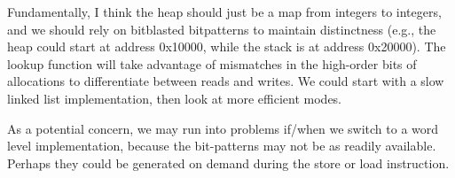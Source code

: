 \documentclass{article}
\begin{document}
Fundamentally, I think the heap should just be a map from integers to integers,
and we should rely on bitblasted bitpatterns to maintain distinctness (e.g.,
the heap could start at address 0x10000, while the stack is at address
0x20000).  The lookup function will take advantage of mismatches in the
high-order bits of allocations to differentiate between reads and writes.  We
could start with a slow linked list implementation, then look at more efficient
modes.

As a potential concern, we may run into problems if/when we switch to a word
level implementation, because the bit-patterns may not be as readily available.
Perhaps they could be generated on demand during the store or load instruction.

\end{document}
